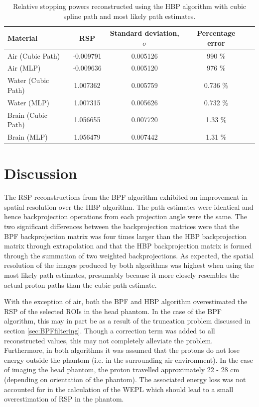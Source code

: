 \documentclass[11pt,a4paper]{article}
\begin{document}
\begin{table}
\centering
\caption{Relative stopping powers reconstructed using the HBP algorithm with cubic spline path and most likely path estimates.}
\begin{tabular}{l|cccc}
\hline
Material & RSP & Standard deviation, $\sigma$ & Percentage error\\ \hline
Air (Cubic Path)     & -0.009791 & 0.005126 &  990 \%\\
Air (MLP)   & -0.009636 & 0.005120 & 976 \% \\
Water (Cubic Path)   & 1.007362 & 0.005759 & 0.736 \% \\
Water (MLP) & 1.007315 & 0.005626 & 0.732 \% \\
Brain (Cubic Path)   & 1.056655 & 0.007720 & 1.33 \% \\
Brain (MLP) & 1.056479 & 0.007442 & 1.31 \% \\
\end{tabular} 
\label{table:RSPresultsHBP}
\end{table}
\section{Discussion}

The RSP reconstructions from the BPF algorithm exhibited an improvement in spatial resolution over the HBP algorithm. The path estimates were identical and hence backprojection operations from each projection angle were the same. The two significant differences between the backprojection matrices were that the BPF backprojection matrix was four times larger than the HBP backprojection matrix through extrapolation and that the HBP backprojection matrix is formed through the summation of two weighted backprojections. As expected, the spatial resolution of the images produced by both algorithms was highest when using the most likely path estimates, presumably because it more closely resembles the actual proton paths than the cubic path estimate.

With the exception of air, both the BPF and HBP algorithm overestimated the RSP of the selected ROIs in the head phantom. In the case of the BPF algorithm, this may in part be as a result of the truncation problem discussed in section \ref{sec:BPFfiltering}. Though a correction term was added to all reconstructed values, this may not completely alleviate the problem. Furthermore, in both algorithms it was assumed that the protons do not lose energy outside the phantom (i.e. in the surrounding air environment). In the case of imaging the head phantom, the proton travelled approximately 22 - 28 cm (depending on orientation of the phantom). The associated energy loss was not accounted for in the calculation of the WEPL which should lead to a small overestimation of RSP in the phantom.
\end{document}
